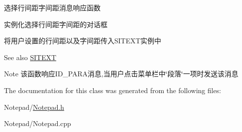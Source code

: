 选择行间距字间距消息响应函数~\newline



\begin{DoxyItemize}
\item 实例化选择行间距字间距的对话框
\item 将用户设置的行间距以及字间距传入\+S\+I\+T\+E\+X\+T实例中 \begin{DoxySeeAlso}{See also}
\hyperlink{class_s_i_t_e_x_t}{S\+I\+T\+E\+XT} 
\end{DoxySeeAlso}
\begin{DoxyNote}{Note}
该函数响应\+I\+D\+\_\+\+P\+A\+R\+A消息,当用户点击菜单栏中\char`\"{}段落\char`\"{}一项时发送该消息 
\end{DoxyNote}

\end{DoxyItemize}

The documentation for this class was generated from the following files\+:\begin{DoxyCompactItemize}
\item 
Notepad/\hyperlink{_notepad_8h}{Notepad.\+h}\item 
Notepad/Notepad.\+cpp\end{DoxyCompactItemize}
